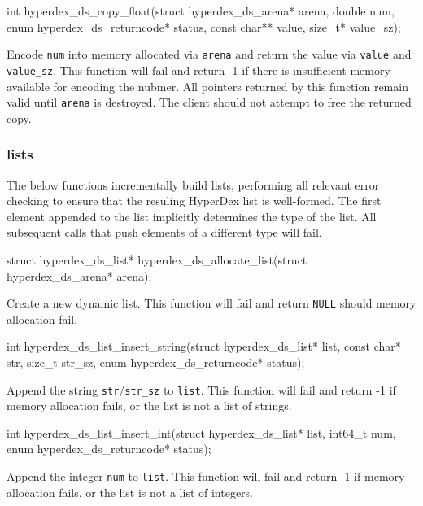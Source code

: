 \funcsep
\begin{ccode}
int hyperdex_ds_copy_float(struct hyperdex_ds_arena* arena, double num,
                           enum hyperdex_ds_returncode* status,
                           const char** value, size_t* value_sz);
\end{ccode}
\funcdesc Encode \texttt{num} into memory allocated via \texttt{arena} and
return the value via \texttt{value} and \texttt{value\_sz}.  This function will
fail and return -1 if there is insufficient memory available for encoding the
nubmer.  All pointers returned by this function remain valid until
\texttt{arena} is destroyed.  The client should not attempt to free the returned
copy.

\subsubsection{lists}

The below functions incrementally build lists, performing all relevant error
checking to ensure that the resuling HyperDex list is well-formed.  The first
element appended to the list implicitly determines the type of the list.  All
subsequent calls that push elements of a different type will fail.

\begin{ccode}
struct hyperdex_ds_list* hyperdex_ds_allocate_list(struct hyperdex_ds_arena* arena);
\end{ccode}
\funcdesc Create a new dynamic list.  This function will fail and return
\texttt{NULL} should memory allocation fail.

\funcsep
\begin{ccode}
int hyperdex_ds_list_insert_string(struct hyperdex_ds_list* list,
                                   const char* str, size_t str_sz,
                                   enum hyperdex_ds_returncode* status);
\end{ccode}
\funcdesc Append the string \texttt{str}/\texttt{str\_sz} to \texttt{list}.
This function will fail and return -1 if memory allocation fails, or the list is
not a list of strings.

\funcsep
\begin{ccode}
int hyperdex_ds_list_insert_int(struct hyperdex_ds_list* list, int64_t num,
                                enum hyperdex_ds_returncode* status);
\end{ccode}
\funcdesc Append the integer \texttt{num} to \texttt{list}.  This function will
fail and return -1 if memory allocation fails, or the list is not a list of
integers.

